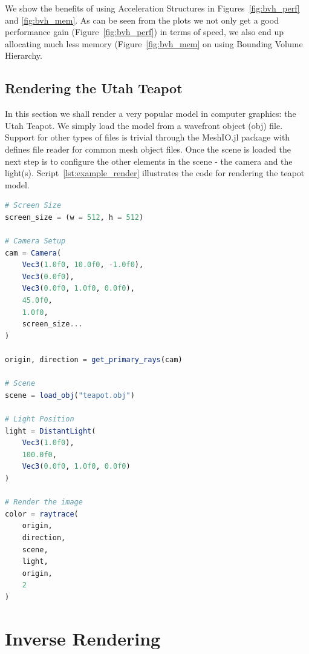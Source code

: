 \documentclass{juliacon}
\begin{document}
We show the benefits of using Acceleration Structures in Figures~\ref{fig:bvh_perf} and \ref{fig:bvh_mem}. As can be seen from the plots we not only get a good performance gain (Figure~\ref{fig:bvh_perf}) in terms of speed, we also end up allocating much less memory (Figure~\ref{fig:bvh_mem} on using Bounding Volume Hierarchy.

\subsection{Rendering the Utah Teapot}

In this section we shall render a very popular model in computer graphics: the Utah Teapot. We simply load the model from a wavefront object (obj) file. Support for other types of files is trivial through the MeshIO.jl package with defines file reader for common mesh object files. Once the scene is loaded the next step is to configure the other elements in the scene - the camera and the light(s). Script~\ref{lst:example_render} illustrates the code for rendering the teapot model.

\noindent
\begin{minipage}{\linewidth}
\begin{lstlisting}[caption = {Rendering the Utah Teapot Model},
                   label = {lst:example_render},
                   captionpos = b,
                   language = Julia]
# Screen Size
screen_size = (w = 512, h = 512)
    
# Camera Setup
cam = Camera(
    Vec3(1.0f0, 10.0f0, -1.0f0),
    Vec3(0.0f0),
    Vec3(0.0f0, 1.0f0, 0.0f0),
    45.0f0,
    1.0f0,
    screen_size...
)
                 
origin, direction = get_primary_rays(cam)
    
# Scene
scene = load_obj("teapot.obj")
    
# Light Position
light = DistantLight(
    Vec3(1.0f0),
    100.0f0,
    Vec3(0.0f0, 1.0f0, 0.0f0)
)
                         
# Render the image
color = raytrace(
    origin,
    direction,
    scene,
    light,
    origin,
    2
)
\end{lstlisting}
\end{minipage}

\section{Inverse Rendering}
\end{document}
